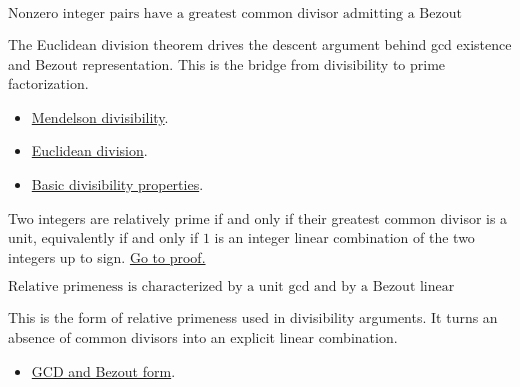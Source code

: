 \begin{remark*}
\[
  \text{Nonzero integer pairs have a greatest common divisor admitting a
  Bezout representation.}
\]
\end{remark*}

\begin{remark*}[Interpretation]
The Euclidean division theorem drives the descent argument behind gcd
existence and Bezout representation. This is the bridge from divisibility to
prime factorization.
\end{remark*}

\begin{dependencies}
\begin{itemize}
  \item \hyperref[def:men-divisibility]{Mendelson divisibility}.
  \item \hyperref[thm:men-euclidean-division]{Euclidean division}.
  \item \hyperref[thm:men-basic-divisibility-properties]{Basic divisibility properties}.
\end{itemize}
\end{dependencies}

\begin{theorem}
\label{thm:men-relative-primeness}
Two integers are relatively prime if and only if their greatest common divisor
is a unit, equivalently if and only if \(1\) is an integer linear combination
of the two integers up to sign.
\hyperref[prf:men-relative-primeness]{Go to proof.}
\end{theorem}

\begin{remark*}
\[
  \text{Relative primeness is characterized by a unit gcd and by a Bezout
  linear combination.}
\]
\end{remark*}

\begin{remark*}[Interpretation]
This is the form of relative primeness used in divisibility arguments. It
turns an absence of common divisors into an explicit linear combination.
\end{remark*}

\begin{dependencies}
\begin{itemize}
  \item \hyperref[thm:men-gcd-bezout]{GCD and Bezout form}.
\end{itemize}
\end{dependencies}

